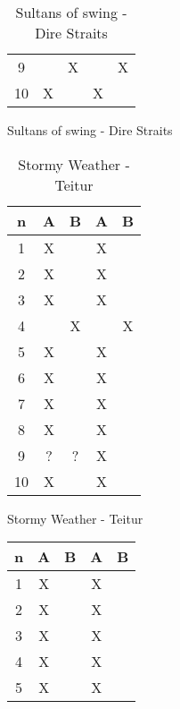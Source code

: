 \begin{figure}[H]
\begin{subfigure}[t]{0.45\textwidth}
\begin{table}[H]
\begin{tabular}{ccccc}
9         &          & X        &         & X       \\
10        & X        &          & X       &         \\ \bottomrule 
\end{tabular}
\caption{Sultans of swing - Dire Straits}
\label{tab:Sultansofswing}
\end{table}
\end{subfigure}
\begin{subfigure}[t]{0.45\textwidth}
\begin{table}[H]
\centering
\begin{tabular}{ccccc}
n       & A      & B      & A      & B      \\ \bottomrule
1       & X      &        & X      &        \\
2       & X      &        & X      &        \\
3       & X      &        & X      &        \\
4       &        & X      &        & X      \\ 
5       & X      &        & X      &        \\ \hline
6       & X      &        & X      &        \\
7       & X      &        & X      &        \\
8       & X      &        & X      &        \\
9       & ?      & ?      & X      &        \\
10      & X      &        & X      &        \\ \bottomrule
\end{tabular}
\caption{Stormy Weather - Teitur}
\label{tab:stormyweather}
\end{table}
\end{subfigure}
\begin{subfigure}[t]{0.45\textwidth}
\begin{table}[H]
\centering
\begin{tabular}{ccccc}
n          & A         & B         & A         & B        \\ \bottomrule
1          & X         &           & X         &          \\
2          & X         &           & X         &          \\
3          & X         &           & X         &          \\
4          & X         &           & X         &          \\ 
5          & X         &           & X         &          \\ \hline

\end{tabular}
\end{table}
\end{subfigure}
\end{figure}

